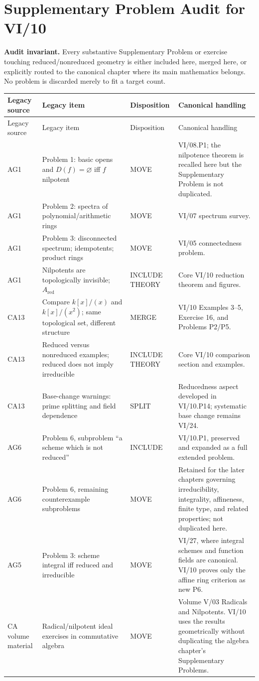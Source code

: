 \chapter*{Supplementary Problem Audit for VI/10}

\noindent\textbf{Audit invariant.}
Every substantive Supplementary Problem or exercise touching reduced/nonreduced geometry is either
included here, merged here, or explicitly routed to the canonical chapter where its main
mathematics belongs.  No problem is discarded merely to fit a target count.

\small
\begin{longtable}{p{}p{}p{}p{}}
\toprule
Legacy source & Legacy item & Disposition & Canonical handling\\
\midrule
\endfirsthead
\toprule
Legacy source & Legacy item & Disposition & Canonical handling\\
\midrule
\endhead
AG1 & Problem 1: basic opens and $D(f)=\varnothing$ iff $f$ nilpotent & MOVE & VI/08.P1; the nilpotence theorem is recalled here but the Supplementary Problem is not duplicated.\\
AG1 & Problem 2: spectra of polynomial/arithmetic rings & MOVE & VI/07 spectrum survey.\\
AG1 & Problem 3: disconnected spectrum; idempotents; product rings & MOVE & VI/05 connectedness problem.\\
AG1 & Nilpotents are topologically invisible; $A_{\mathrm{red}}$ & INCLUDE THEORY & Core VI/10 reduction theorem and figures.\\
CA13 & Compare $k[x]/(x)$ and $k[x]/(x^2)$; same topological set, different structure & MERGE & VI/10 Examples 3--5, Exercise 16, and Problems P2/P5.\\
CA13 & Reduced versus nonreduced examples; reduced does not imply irreducible & INCLUDE THEORY & Core VI/10 comparison section and examples.\\
CA13 & Base-change warnings: prime splitting and field dependence & SPLIT & Reducedness aspect developed in VI/10.P14; systematic base change remains VI/24.\\
AG6 & Problem 6, subproblem ``a scheme which is not reduced'' & INCLUDE & VI/10.P1, preserved and expanded as a full extended problem.\\
AG6 & Problem 6, remaining counterexample subproblems & MOVE & Retained for the later chapters governing irreducibility, integrality, affineness, finite type, and related properties; not duplicated here.\\
AG5 & Problem 3: scheme integral iff reduced and irreducible & MOVE & VI/27, where integral schemes and function fields are canonical.  VI/10 proves only the affine ring criterion as new P6.\\
CA volume material & Radical/nilpotent ideal exercises in commutative algebra & MOVE & Volume V/03 Radicals and Nilpotents.  VI/10 uses the results geometrically without duplicating the algebra chapter's Supplementary Problems.\\
\bottomrule
\end{longtable}

